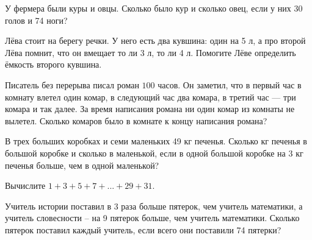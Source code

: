 \begin{listofex}
	\item У фермера были куры и овцы. Сколько было кур и сколько овец, если у
	них 30 голов и 74 ноги?
	\item Лёва стоит на берегу речки. У него есть два кувшина: один на 5 л, а про второй Лёва помнит, что он вмещает то ли 3 л, то ли 4 л. Помогите Лёве определить ёмкость второго
	кувшина.
	\item Писатель без перерыва писал роман \( 100 \) часов. Он заметил, что в первый час в комнату влетел один комар, в следующий час два комара, в третий час --- три комара и так далее. За время написания романа ни один комар из комнаты не вылетел. Сколько комаров было в комнате к концу написания романа?
	\item В трех больших коробках и семи маленьких 49 кг печенья. Сколько кг печенья в большой коробке и сколько в маленькой, если в одной большой коробке на 3 кг печенья больше, чем в
	одной маленькой?
	\item Вычислите \( 1+3+5+7+...+29+31 \).
	\item Учитель истории поставил в 3 раза больше пятерок, чем учитель математики, а учитель
	словесности – на 9 пятерок больше, чем учитель математики. Сколько пятерок поставил
	каждый учитель, если всего они поставили 74 пятерки?
\end{listofex}